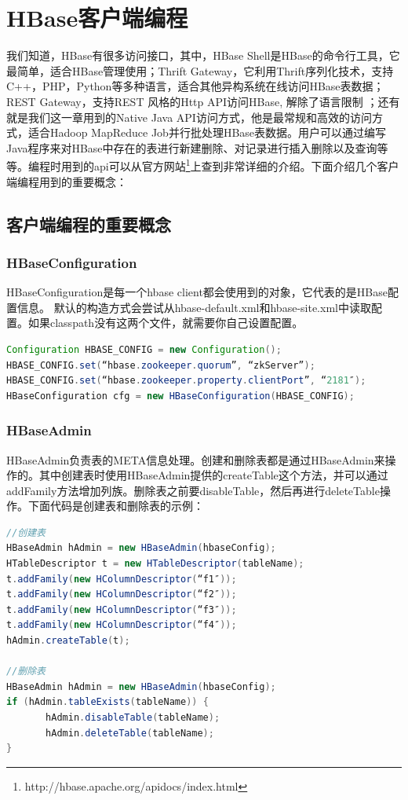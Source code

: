 \chapter{HBase客户端编程}
我们知道，HBase有很多访问接口，其中，HBase Shell是HBase的命令行工具，它最简单，适合HBase管理使用；Thrift Gateway，它利用Thrift序列化技术，支持C++，PHP，Python等多种语言，适合其他异构系统在线访问HBase表数据；REST Gateway，支持REST 风格的Http API访问HBase, 解除了语言限制
；还有就是我们这一章用到的Native Java API访问方式，他是最常规和高效的访问方式，适合Hadoop MapReduce Job并行批处理HBase表数据。用户可以通过编写Java程序来对HBase中存在的表进行新建删除、对记录进行插入删除以及查询等等。编程时用到的api可以从官方网站\footnote{http://hbase.apache.org/apidocs/index.html}上查到非常详细的介绍。下面介绍几个客户端编程用到的重要概念：

\section{客户端编程的重要概念}

\subsection{HBaseConfiguration}
HBaseConfiguration是每一个hbase client都会使用到的对象，它代表的是HBase配置信息。
默认的构造方式会尝试从hbase-default.xml和hbase-site.xml中读取配置。如果classpath没有这两个文件，就需要你自己设置配置。
\begin{lstlisting}[language=Java]
Configuration HBASE_CONFIG = new Configuration();
HBASE_CONFIG.set(“hbase.zookeeper.quorum”, “zkServer”);
HBASE_CONFIG.set(“hbase.zookeeper.property.clientPort”, “2181″);
HBaseConfiguration cfg = new HBaseConfiguration(HBASE_CONFIG);
\end{lstlisting}

\subsection{HBaseAdmin}
HBaseAdmin负责表的META信息处理。创建和删除表都是通过HBaseAdmin来操作的。其中创建表时使用HBaseAdmin提供的createTable这个方法，并可以通过addFamily方法增加列族。删除表之前要disableTable，然后再进行deleteTable操作。下面代码是创建表和删除表的示例：

\begin{lstlisting}[language=Java]
//创建表
HBaseAdmin hAdmin = new HBaseAdmin(hbaseConfig);
HTableDescriptor t = new HTableDescriptor(tableName);
t.addFamily(new HColumnDescriptor(“f1″));
t.addFamily(new HColumnDescriptor(“f2″));
t.addFamily(new HColumnDescriptor(“f3″));
t.addFamily(new HColumnDescriptor(“f4″));
hAdmin.createTable(t);

//删除表
HBaseAdmin hAdmin = new HBaseAdmin(hbaseConfig);
if (hAdmin.tableExists(tableName)) {
       hAdmin.disableTable(tableName);
       hAdmin.deleteTable(tableName);
}
\end{lstlisting}

